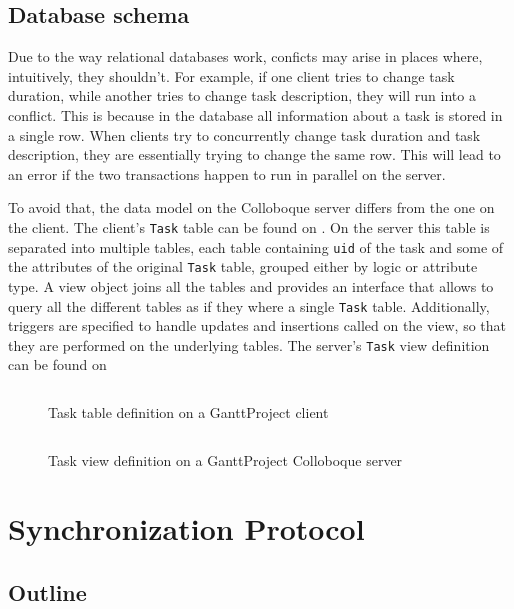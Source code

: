 \documentclass[a4paper, 11pt, oneside]{article}
\theoremstyle{definition}
\begin{document}
\subsection{Database schema}
Due to the way relational databases work, conficts may arise in places where, intuitively, they shouldn't. For example, if one client tries to change task duration, while another tries to change task description, they will run into a conflict. This is because in the database all information about a task is stored in a single row. When clients try to concurrently change task duration and task description, they are essentially trying to change the same row. This will lead to an error if the two transactions happen to run in parallel on the server.

To avoid that, the data model on the Colloboque server differs from the one on the client. The client's \verb|Task| table can be found on . On the server this table is separated into multiple tables, each table containing \verb|uid| of the task and some of the attributes of the original \verb|Task| table, grouped either by logic or attribute type. A view object joins all the tables and provides an interface that allows to query all the different tables as if they where a single \verb|Task| table. Additionally, triggers are specified to handle updates and insertions called on the view, so that they are performed on the underlying tables. The server's \verb|Task| view definition can be found on 

\begin{figure}
    \inputminted[frame=single,linenos]{sql}{lst/client-database-init.sql}
    \caption{Task table definition on a GanttProject client}
    \label{fig:client-database-init}
\end{figure}

\begin{figure}
    \inputminted[frame=single,linenos,fontsize=\small]{sql}{lst/server-database-init.sql}
    \caption{Task view definition on a GanttProject Colloboque server}
    \label{fig:server-database-init}
\end{figure}

\section{Synchronization Protocol}\label{sec:protocol}

\subsection{Outline}
\end{document}
